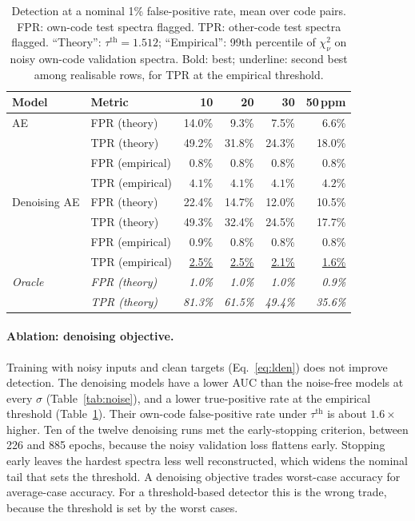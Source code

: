 \begin{table}[t]
  \centering
  \caption{Detection at a nominal 1\% false-positive rate, mean over code pairs. FPR: own-code test spectra flagged. TPR: other-code test spectra flagged. ``Theory'': $\tau^{\mathrm{th}}=1.512$; ``Empirical'': 99th percentile of $\chi^2_\nu$ on noisy own-code validation spectra. Bold: best; underline: second best among realisable rows, for TPR at the empirical threshold.}
  \label{tab:calib}
  \begin{tabular}{llrrrr}
    \toprule
    Model & Metric & 10 & 20 & 30 & 50\,ppm \\
    \midrule
    AE           & FPR (theory)    & 14.0\% & 9.3\%  & 7.5\%  & 6.6\% \\
                 & TPR (theory)    & 49.2\% & 31.8\% & 24.3\% & 18.0\% \\
                 & FPR (empirical) & 0.8\%  & 0.8\%  & 0.8\%  & 0.8\% \\
                 & TPR (empirical) & $\mathbf{4.1\%}$ & $\mathbf{4.1\%}$ & $\mathbf{4.1\%}$ & $\mathbf{4.2\%}$ \\
    \midrule
    Denoising AE & FPR (theory)    & 22.4\% & 14.7\% & 12.0\% & 10.5\% \\
                 & TPR (theory)    & 49.3\% & 32.4\% & 24.5\% & 17.7\% \\
                 & FPR (empirical) & 0.9\%  & 0.8\%  & 0.8\%  & 0.8\% \\
                 & TPR (empirical) & \underline{2.5\%} & \underline{2.5\%} & \underline{2.1\%} & \underline{1.6\%} \\
    \midrule
    \textit{Oracle} & \textit{FPR (theory)} & \textit{1.0\%} & \textit{1.0\%} & \textit{1.0\%} & \textit{0.9\%} \\
                    & \textit{TPR (theory)} & \textit{81.3\%} & \textit{61.5\%} & \textit{49.4\%} & \textit{35.6\%} \\
    \bottomrule
  \end{tabular}
\end{table}

\paragraph{Ablation: denoising objective.}
Training with noisy inputs and clean targets (Eq.~\ref{eq:lden}) does not improve detection.
The denoising models have a lower AUC than the noise-free models at every $\sigma$ (Table~\ref{tab:noise}), and a lower true-positive rate at the empirical threshold (Table~\ref{tab:calib}).
Their own-code false-positive rate under $\tau^{\mathrm{th}}$ is about $1.6\times$ higher.
Ten of the twelve denoising runs met the early-stopping criterion, between 226 and 885 epochs, because the noisy validation loss flattens early.
Stopping early leaves the hardest spectra less well reconstructed, which widens the nominal tail that sets the threshold.
A denoising objective trades worst-case accuracy for average-case accuracy.
For a threshold-based detector this is the wrong trade, because the threshold is set by the worst cases.

